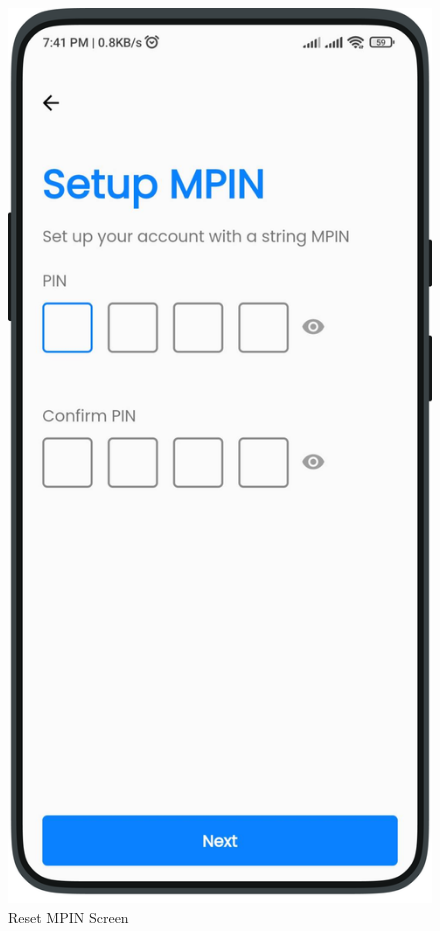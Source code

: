 \begin{multicols}{2}
\begin{figure}[H]
        \includegraphics[width=0.6\linewidth]{images/results/mobile/SetupMPIN.png}
        \caption[Reset MPIN Screen]{Reset MPIN Screen}
        \label{fig:SetupMPIN.png}
        \end{figure}
      \end{multicols}
      

